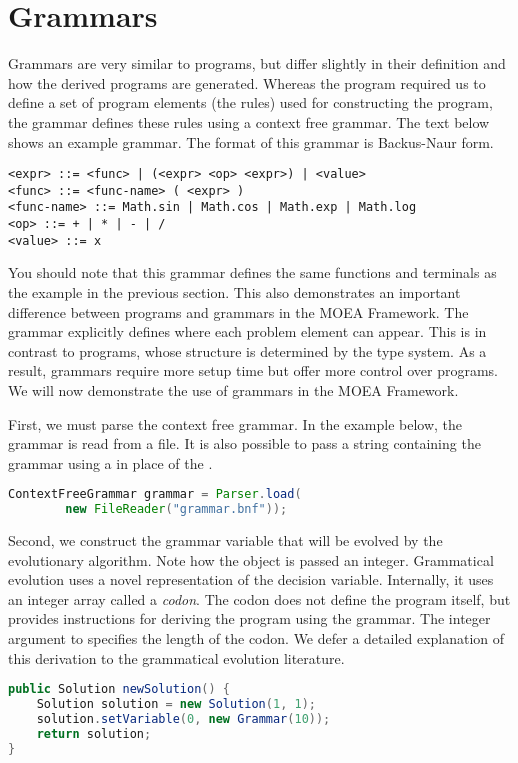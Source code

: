 \section{Grammars}
Grammars are very similar to programs, but differ slightly in their definition and how the derived programs are generated.  Whereas the program required us to define a set of program elements (the rules) used for constructing the program, the grammar defines these rules using a context free grammar.  The text below shows an example grammar.  The format of this grammar is Backus-Naur form.
\begin{lstlisting}[language=Plaintext]
<expr> ::= <func> | (<expr> <op> <expr>) | <value>
<func> ::= <func-name> ( <expr> )
<func-name> ::= Math.sin | Math.cos | Math.exp | Math.log
<op> ::= + | * | - | /
<value> ::= x
\end{lstlisting}

You should note that this grammar defines the same functions and terminals as the example in the previous section.  This also demonstrates an important difference between programs and grammars in the MOEA Framework.  The grammar explicitly defines where each problem element can appear.  This is in contrast to programs, whose structure is determined by the type system.  As a result, grammars require more setup time but offer more control over programs.  We will now demonstrate the use of grammars in the MOEA Framework.

First, we must parse the context free grammar.  In the example below, the grammar is read from a file.  It is also possible to pass a string containing the grammar using a  in place of the .
\begin{lstlisting}[language=Java]
    ContextFreeGrammar grammar = Parser.load(
        new FileReader("grammar.bnf"));
\end{lstlisting}

Second, we construct the grammar variable that will be evolved by the evolutionary algorithm.  Note how the  object is passed an integer.  Grammatical evolution uses a novel representation of the decision variable.  Internally, it uses an integer array called a \emph{codon}.  The codon does not define the program itself, but provides instructions for deriving the program using the grammar.  The integer argument to  specifies the length of the codon.  We defer a detailed explanation of this derivation to the grammatical evolution literature.
\begin{lstlisting}[language=Java]
public Solution newSolution() {
    Solution solution = new Solution(1, 1);
    solution.setVariable(0, new Grammar(10));
    return solution;
}
\end{lstlisting}

